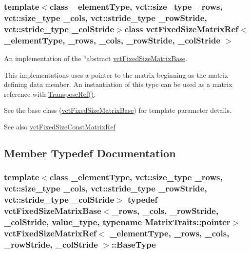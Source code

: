 \subsubsection*{template$<$class \+\_\+element\+Type, vct\+::size\+\_\+type \+\_\+rows, vct\+::size\+\_\+type \+\_\+cols, vct\+::stride\+\_\+type \+\_\+row\+Stride, vct\+::stride\+\_\+type \+\_\+col\+Stride$>$class vct\+Fixed\+Size\+Matrix\+Ref$<$ \+\_\+element\+Type, \+\_\+rows, \+\_\+cols, \+\_\+row\+Stride, \+\_\+col\+Stride $>$}

An implementation of the ``abstract\textquotesingle{}\textquotesingle{} \hyperlink{classvct_fixed_size_matrix_base}{vct\+Fixed\+Size\+Matrix\+Base}. 

This implementations uses a pointer to the matrix beginning as the matrix defining data member. An instantiation of this type can be used as a matrix reference with \hyperlink{classvct_fixed_size_matrix_base_a8652991f4652d49f52c33a20e293b355}{Transpose\+Ref()}.

See the base class (\hyperlink{classvct_fixed_size_matrix_base}{vct\+Fixed\+Size\+Matrix\+Base}) for template parameter details.

\begin{DoxySeeAlso}{See also}
\hyperlink{classvct_fixed_size_const_matrix_ref}{vct\+Fixed\+Size\+Const\+Matrix\+Ref} 
\end{DoxySeeAlso}


\subsection{Member Typedef Documentation}
\hypertarget{classvct_fixed_size_matrix_ref_a83c7be1d6fbc75488c082cb53ebcb2ed}{}
\subsubsection[{Base\+Type}]{\setlength{\rightskip}{0pt plus 5cm}template$<$class \+\_\+element\+Type, vct\+::size\+\_\+type \+\_\+rows, vct\+::size\+\_\+type \+\_\+cols, vct\+::stride\+\_\+type \+\_\+row\+Stride, vct\+::stride\+\_\+type \+\_\+col\+Stride$>$ typedef {\bf vct\+Fixed\+Size\+Matrix\+Base}$<$\+\_\+rows, \+\_\+cols, \+\_\+row\+Stride, \+\_\+col\+Stride, value\+\_\+type, typename Matrix\+Traits\+::pointer$>$ {\bf vct\+Fixed\+Size\+Matrix\+Ref}$<$ \+\_\+element\+Type, \+\_\+rows, \+\_\+cols, \+\_\+row\+Stride, \+\_\+col\+Stride $>$\+::{\bf Base\+Type}}\label{classvct_fixed_size_matrix_ref_a83c7be1d6fbc75488c082cb53ebcb2ed}
\hypertarget{classvct_fixed_size_matrix_ref_a7c8a96934427f6a5a5c410abe5c0fccb}{}
